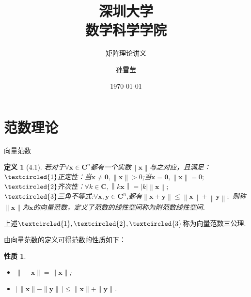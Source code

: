 \documentclass{sintefbeamer}[dark]
\title{深圳大学\\数学科学学院}
\subtitle{矩阵理论讲义}
\author{\href{2300201005@email.szu.edu.cn}{孙雪莹}}
\date{\today}
\newtheorem*{定义}{定义}
\newtheorem*{性质}{性质}
\begin{document}
\maketitle

\section{范数理论}
\begin{frame}{向量范数}
	\begin{定义}[4.1]
		若对于${\forall}\bm{x}\in\mathbf{C}^{n}$都有一个实数$\left \| \bm{x}\right \|$与之对应，且满足：
		\\
		$\textcircled{1}$正定性：当$\bm{x}\neq\bm{0},\left \| \bm{x}\right \|>0$;当$\bm{x}=\bm{0},\left \| \bm{x}\right \|=0;$
		\\
		$\textcircled{2}$齐次性：${\forall}k\in\mathbf{C},\left \| k\bm{x}\right \|=|k|\left \| \bm{x}\right \|;$
		\\
		$\textcircled{3}$三角不等式:${\forall}\bm{x},\bm{y}\in\mathbf{C}^{n}$,都有$\left \| \bm{x}+\bm{y}\right \|\le\left \| \bm{x}\right \|+\left \| \bm{y}\right \|;$
		\linebreak
        则称$\|\bm{x}\|$为$\bm{x}$的向量范数，定义了范数的线性空间称为附范数线性空间.
    \end{定义}
       
        上述$\textcircled{1},\textcircled{2},\textcircled{3}$称为向量范数三公理.
\end{frame}

\begin{frame}
	由向量范数的定义可得范数的性质如下：
	\begin{性质}
		\begin{itemize}[<+->]
		\item$\|-\bm{x}\|=\|\bm{x}\|$;
		\item$|\, \|\bm{x}\|-\|\bm{y}\|\,|\le \|\bm{x}\|+\|\bm{y}\|$.
		\end{itemize}
	\end{性质}
\end{frame}
\end{document}
